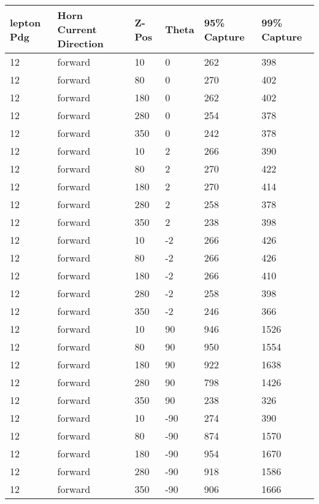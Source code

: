 \begin{table}
	\begin{center}
		\begin{tabular}{|l|l|l|l|l|l|}
			\hline
			lepton Pdg & Horn Current Direction & Z-Pos & Theta & 95\% Capture & 99\% Capture \\
			\hline
			12 & forward & 10 & 0 & 262 & 398 \\
			\hline
			12 & forward & 80 & 0 & 270 & 402 \\
			\hline
			12 & forward & 180 & 0 & 262 & 402 \\
			\hline
			12 & forward & 280 & 0 & 254 & 378 \\
			\hline
			12 & forward & 350 & 0 & 242 & 378 \\
			\hline
			12 & forward & 10 & 2 & 266 & 390 \\
			\hline
			12 & forward & 80 & 2 & 270 & 422 \\
			\hline
			12 & forward & 180 & 2 & 270 & 414 \\
			\hline
			12 & forward & 280 & 2 & 258 & 378 \\
			\hline
			12 & forward & 350 & 2 & 238 & 398 \\
			\hline
			12 & forward & 10 & -2 & 266 & 426 \\
			\hline
			12 & forward & 80 & -2 & 266 & 426 \\
			\hline
			12 & forward & 180 & -2 & 266 & 410 \\
			\hline
			12 & forward & 280 & -2 & 258 & 398 \\
			\hline
			12 & forward & 350 & -2 & 246 & 366 \\
			\hline
			12 & forward & 10 & 90 & 946 & 1526 \\
			\hline
			12 & forward & 80 & 90 & 950 & 1554 \\
			\hline
			12 & forward & 180 & 90 & 922 & 1638 \\
			\hline
			12 & forward & 280 & 90 & 798 & 1426 \\
			\hline
			12 & forward & 350 & 90 & 238 & 326 \\
			\hline
			12 & forward & 10 & -90 & 274 & 390 \\
			\hline
			12 & forward & 80 & -90 & 874 & 1570 \\
			\hline
			12 & forward & 180 & -90 & 954 & 1670 \\
			\hline
			12 & forward & 280 & -90 & 918 & 1586 \\
			\hline
			12 & forward & 350 & -90 & 906 & 1666 \\

\end{tabular}
\end{center}
\end{table}
